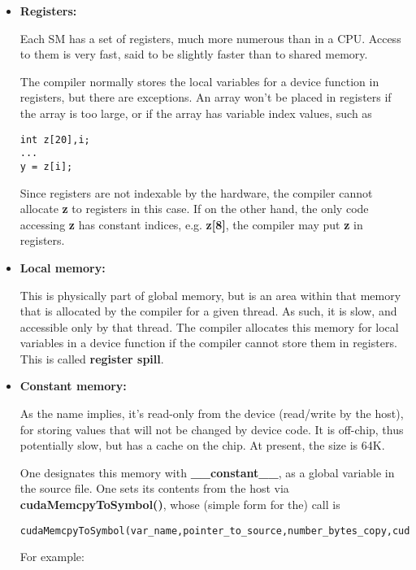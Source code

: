 \begin{itemize}

\item {\bf Registers:}  

Each SM has a set of registers, much more numerous than in a CPU.
Access to them is very fast, said to be slightly faster than to shared
memory.

The compiler normally stores the local variables for a device function
in registers, but there are exceptions.  An array won't be placed in
registers if the array is too large, or if the array has variable index
values, such as

\begin{Verbatim}[fontsize=\relsize{-2}]
int z[20],i;
...
y = z[i];
\end{Verbatim}

Since registers are not indexable by the hardware, the compiler cannot
allocate {\bf z} to registers in this case.  If on the other hand, the
only code accessing {\bf z} has constant indices, e.g. {\bf z[8]}, the
compiler may put {\bf z} in registers.

\item {\bf Local memory:}  

This is physically part of global memory, but is an area within that
memory that is allocated by the compiler for a given thread.  As such,
it is slow, and accessible only by that thread.  The compiler allocates
this memory for local variables in a device function if the compiler
cannot store them in registers.  This is called {\bf register spill}.

\item {\bf Constant memory:}  

As the name implies, it's read-only from the device (read/write by the
host), for storing values that will not be changed by device code.  It
is off-chip, thus potentially slow, but has a cache on the chip.  At
present, the size is 64K.

One designates this memory with {\bf \_\_constant\_\_}, as a global
variable in the source file.  One sets its contents from the host via
{\bf cudaMemcpyToSymbol()}, whose (simple form for the) call is

\begin{Verbatim}[fontsize=\relsize{-2}]
cudaMemcpyToSymbol(var_name,pointer_to_source,number_bytes_copy,cudaMemcpyHostToDevice)
\end{Verbatim}

For example:


\end{itemize}
